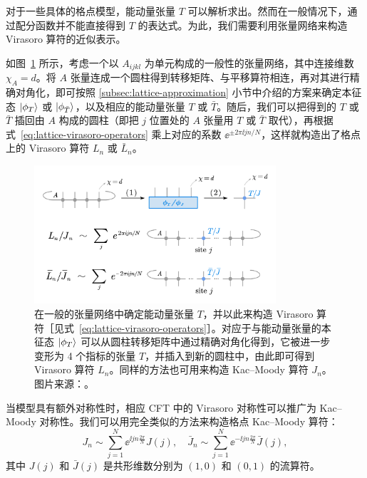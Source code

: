 对于一些具体的格点模型\cite{koo1994representations,milsted2017extraction}，能动量张量 $T$ 可以解析求出。然而在一般情况下，通过配分函数并不能直接得到 $T$ 的表达式。为此，我们需要利用张量网络来构造 Virasoro 算符的近似表示。

如图~\ref{fig:virasoro-construction} 所示，考虑一个以 $A_{ijkl}$ 为单元构成的一般性的张量网络，其中连接维数 $\chi_A=d$。将 $A$ 张量连成一个圆柱得到转移矩阵、与平移算符相连，再对其进行精确对角化，即可按照 \ref{subsec:lattice-approximation} 小节中介绍的方案来确定本征态 $\ket*{\phi_T}$ 或 $\ket*{\phi_{\bar{T}}}$，以及相应的能动量张量 $T$ 或 $\bar{T}$。随后，我们可以把得到的 $T$ 或 $\bar{T}$ 插回由 $A$ 构成的圆柱（即把 $j$ 位置处的 $A$ 张量用 $T$ 或 $\bar{T}$ 取代），再根据式~\eqref{eq:lattice-virasoro-operators} 乘上对应的系数 $\ee^{\pm2\pi\ii j n/N}$，这样就构造出了格点上的 Virasoro 算符 $L_n$ 或 $\bar{L}_n$。

\begin{figure}[ht]
  \centering
  \includegraphics[width=0.8\textwidth]{images/virasoro/construction.pdf}
  \caption[能动量张量与 Virasoro 算符的构造]{在一般的张量网络中确定能动量张量 $T$，并以此来构造 Virasoro 算符［见式~\eqref{eq:lattice-virasoro-operators}］。对应于与能动量张量的本征态 $\ket*{\phi_T}$ 可以从圆柱转移矩阵中通过精确对角化得到，它被进一步变形为 4 个指标的张量 $T$，并插入到新的圆柱中，由此即可得到 Virasoro 算符 $L_n$。同样的方法也可用来构造 Kac--Moody 算符 $J_n$。图片来源：\parencite{wang2022virasoro}。}
  \label{fig:virasoro-construction}
\end{figure}

当模型具有额外对称性时，相应 CFT 中的 Virasoro 对称性可以推广为 Kac--Moody 对称性。我们可以用完全类似的方法来构造格点 Kac--Moody 算符：
\begin{equation}
  J_n       \sim \sum_{j=1}^N \ee^{ \ii j n \frac{2\pi}{N}} J(j), \quad
  \bar{J}_n \sim \sum_{j=1}^N \ee^{-\ii j n \frac{2\pi}{N}} \bar{J}(j),
\end{equation}
其中 $J(j)$ 和 $\bar{J}(j)$ 是共形维数分别为 $(1,0)$ 和 $(0,1)$ 的流算符。

